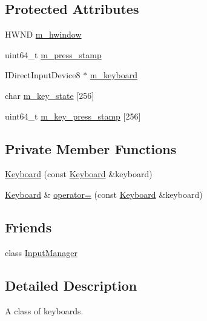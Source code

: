\subsection*{Protected Attributes}
\begin{DoxyCompactItemize}
\item 
H\+W\+ND \hyperlink{classmage_1_1_keyboard_aa7196c689dad6f5aaf35e3929de02791}{m\+\_\+hwindow}
\item 
uint64\+\_\+t \hyperlink{classmage_1_1_keyboard_a2c638a93d1f61d9d3578a0df8b6a1c39}{m\+\_\+press\+\_\+stamp}
\item 
I\+Direct\+Input\+Device8 $\ast$ \hyperlink{classmage_1_1_keyboard_ae1325369d4863cc36ec1a0359dbf27fb}{m\+\_\+keyboard}
\item 
char \hyperlink{classmage_1_1_keyboard_ad3361790f2c9cc5ca19161f0c8e24acd}{m\+\_\+key\+\_\+state} \mbox{[}256\mbox{]}
\item 
uint64\+\_\+t \hyperlink{classmage_1_1_keyboard_a8eb4ce7e4e2395bb27d2ac9236655335}{m\+\_\+key\+\_\+press\+\_\+stamp} \mbox{[}256\mbox{]}
\end{DoxyCompactItemize}
\subsection*{Private Member Functions}
\begin{DoxyCompactItemize}
\item 
\hyperlink{classmage_1_1_keyboard_a3137ba9455bcfddf6368e35bdf2d8a93}{Keyboard} (const \hyperlink{classmage_1_1_keyboard}{Keyboard} \&keyboard)
\item 
\hyperlink{classmage_1_1_keyboard}{Keyboard} \& \hyperlink{classmage_1_1_keyboard_a3230d2216ce7e6bb5bd13059524ee72c}{operator=} (const \hyperlink{classmage_1_1_keyboard}{Keyboard} \&keyboard)
\end{DoxyCompactItemize}
\subsection*{Friends}
\begin{DoxyCompactItemize}
\item 
class \hyperlink{classmage_1_1_keyboard_af0e8c3dcc20b7ddcaf63506363a22821}{Input\+Manager}
\end{DoxyCompactItemize}


\subsection{Detailed Description}
A class of keyboards. 

